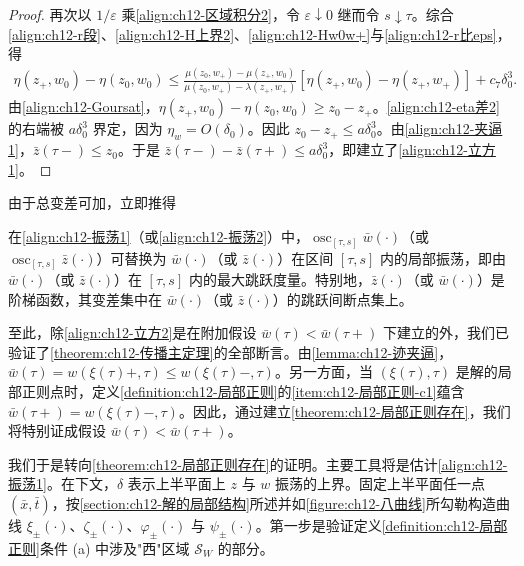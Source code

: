 \documentclass[../../main.tex]{subfiles}
\begin{document}
\begin{proof}
再次以 $1/\varepsilon$ 乘\eqref{align:ch12-区域积分2}，令 $\varepsilon\downarrow0$ 继而令 $s\downarrow\tau$。综合\eqref{align:ch12-r段}、\eqref{align:ch12-H上界2}、\eqref{align:ch12-Hw0w+}与\eqref{align:ch12-r比eps}，得
\begin{align}
\eta(z_+,w_0)-\eta(z_0,w_0)\leqslant\frac{\mu(z_0,w_+)-\mu(z_+,w_0)}{\mu(z_0,w_+)-\lambda(z_+,w_+)}[\eta(z_+,w_0)-\eta(z_+,w_+)]+c_7\delta_0^3.
\label{align:ch12-eta差2}
\end{align}
由\eqref{align:ch12-Goursat}，$\eta(z_+,w_0)-\eta(z_0,w_0)\geqslant z_0-z_+$。\eqref{align:ch12-eta差2}的右端被 $a\delta_0^3$ 界定，因为 $\eta_w=O(\delta_0)$。因此 $z_0-z_+\leqslant a\delta_0^3$。由\eqref{align:ch12-夹逼1}，$\bar z(\tau-)\leqslant z_0$。于是 $\bar z(\tau-)-\bar z(\tau+)\leqslant a\delta_0^3$，即建立了\eqref{align:ch12-立方1}。
\end{proof}

由于总变差可加，立即推得

\begin{corollary}\label{corollary:ch12-局部振荡}
在\eqref{align:ch12-振荡1}（或\eqref{align:ch12-振荡2}）中，$\operatorname{osc}_{[\tau,s]}\bar w(\cdot)$（或 $\operatorname{osc}_{[\tau,s]}\bar z(\cdot)$）可替换为 $\bar w(\cdot)$（或 $\bar z(\cdot)$）在区间 $[\tau,s]$ 内的局部振荡，即由 $\bar w(\cdot)$（或 $\bar z(\cdot)$）在 $[\tau,s]$ 内的最大跳跃度量。特别地，$\bar z(\cdot)$（或 $\bar w(\cdot)$）是阶梯函数，其变差集中在 $\bar w(\cdot)$（或 $\bar z(\cdot)$）的跳跃间断点集上。
\end{corollary}

至此，除\eqref{align:ch12-立方2}是在附加假设 $\bar w(\tau)<\bar w(\tau+)$ 下建立的外，我们已验证了\cref{theorem:ch12-传播主定理}的全部断言。由\cref{lemma:ch12-迹夹逼}，$\bar w(\tau)=w(\xi(\tau)+,\tau)\leqslant w(\xi(\tau)-,\tau)$。另一方面，当 $(\xi(\tau),\tau)$ 是解的局部正则点时，定义\cref{definition:ch12-局部正则}的\ref{item:ch12-局部正则-c1}蕴含 $\bar w(\tau+)=w(\xi(\tau)-,\tau)$。因此，通过建立\cref{theorem:ch12-局部正则存在}，我们将特别证成假设 $\bar w(\tau)<\bar w(\tau+)$。

我们于是转向\cref{theorem:ch12-局部正则存在}的证明。主要工具将是估计\eqref{align:ch12-振荡1}。在下文，$\delta$ 表示上半平面上 $z$ 与 $w$ 振荡的上界。固定上半平面任一点 $(\bar x,\bar t)$，按\cref{section:ch12-解的局部结构}所述并如\cref{figure:ch12-八曲线}所勾勒构造曲线 $\xi_\pm(\cdot)$、$\zeta_\pm(\cdot)$、$\varphi_\pm(\cdot)$ 与 $\psi_\pm(\cdot)$。第一步是验证定义\cref{definition:ch12-局部正则}条件 (a) 中涉及"西"区域 $\mathscr{S}_W$ 的部分。
\end{document}

